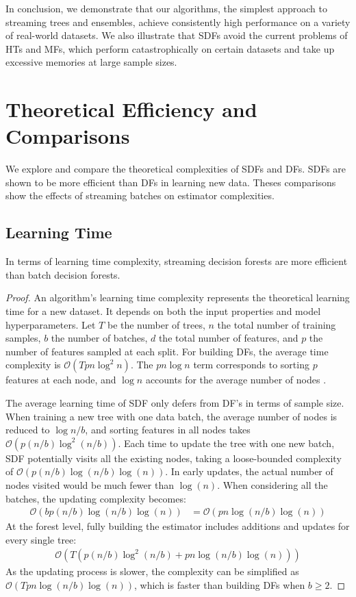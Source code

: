 In conclusion, we demonstrate that our algorithms, the simplest approach to streaming trees and ensembles, achieve consistently high performance on a variety of real-world datasets. 
We also illustrate that SDFs avoid the current problems of HTs and MFs, which perform catastrophically on certain datasets and take up excessive memories at large sample sizes. 

\section{Theoretical Efficiency and Comparisons}
\label{theory}
We explore and compare the theoretical complexities of SDFs and DFs. SDFs are shown to be more efficient than DFs in learning new data. Theses comparisons show the effects of streaming batches on estimator complexities.

\subsection{Learning Time}
\label{theory:time}
\begin{lemma}
In terms of learning time complexity, streaming decision forests are more efficient than batch decision forests.
\end{lemma}

\begin{proof}
An algorithm's learning time complexity represents the theoretical learning time for a new dataset. It depends on both the input properties and model hyperparameters. Let $T$ be the number of trees, $n$ the total number of training samples, $b$ the number of batches, $d$ the total number of features, and $p$ the number of features sampled at each split. For building DFs, the average time complexity is $\mathcal{O}(Tpn\log^2{n})$. The $pn\log{n}$ term corresponds to sorting $p$ features at each node, and $\log{n}$ accounts for the average number of nodes \citep{louppe_understanding_2015}. 

The average learning time of SDF only defers from DF's in terms of sample size. When training a new tree with one data batch, the average number of nodes is reduced to $\log{n/b}$, and sorting features in all nodes takes $\mathcal{O}(p(n/b)\log^2(n/b))$. Each time to update the tree with one new batch, SDF potentially visits all the existing nodes, taking a loose-bounded complexity of $\mathcal{O}(p(n/b)\log(n/b)\log(n))$. In early updates, the actual number of nodes visited would be much fewer than $\log(n)$. When considering all the batches, the updating complexity becomes:
\begin{align*}
    \mathcal{O}(bp(n/b)\log(n/b)\log(n))
    &= \mathcal{O}(pn\log(n/b)\log(n))
\end{align*}
At the forest level, fully building the estimator includes additions and updates for every single tree: 
\begin{align*}
    \mathcal{O}(T(p(n/b)\log^2{(n/b)} + pn\log(n/b)\log(n)))
\end{align*}
As the updating process is slower, the complexity can be simplified as $\mathcal{O}(Tpn\log(n/b)\log(n))$, which is faster than building DFs when $b \geq 2$.
\end{proof}

